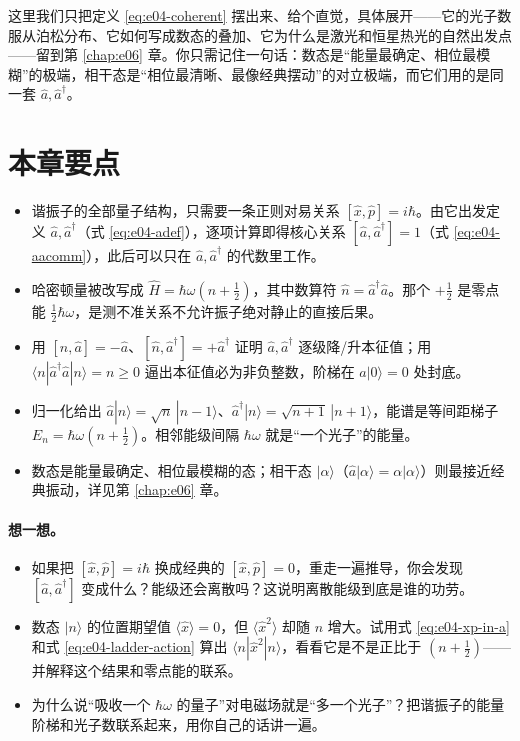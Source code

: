 这里我们只把定义 \eqref{eq:e04-coherent} 摆出来、给个直觉，具体展开——它的光子数服从泊松分布、它如何写成数态的叠加、它为什么是激光和恒星热光的自然出发点——留到第 \ref{chap:e06} 章。你只需记住一句话：数态是“能量最确定、相位最模糊”的极端，相干态是“相位最清晰、最像经典摆动”的对立极端，而它们用的是同一套 \(\hat a,\hat a^\dagger\)。

\section{本章要点}
\label{sec:e04-summary}

\begin{itemize}
  \item 谐振子的全部量子结构，只需要一条正则对易关系 \([\hat x,\hat p]=i\hbar\)。由它出发定义 \(\hat a,\hat a^\dagger\)（式 \eqref{eq:e04-adef}），逐项计算即得核心关系 \([\hat a,\hat a^\dagger]=1\)（式 \eqref{eq:e04-aacomm}），此后可以只在 \(\hat a,\hat a^\dagger\) 的代数里工作。
  \item 哈密顿量被改写成 \(\hat H=\hbar\omega(\hat n+\tfrac12)\)，其中数算符 \(\hat n=\hat a^\dagger\hat a\)。那个 \(+\tfrac12\) 是零点能 \(\tfrac12\hbar\omega\)，是测不准关系不允许振子绝对静止的直接后果。
  \item 用 \([\hat n,\hat a]=-\hat a\)、\([\hat n,\hat a^\dagger]=+\hat a^\dagger\) 证明 \(\hat a,\hat a^\dagger\) 逐级降/升本征值；用 \(\langle n|\hat a^\dagger\hat a|n\rangle=n\ge0\) 逼出本征值必为非负整数，阶梯在 \(\hat a|0\rangle=0\) 处封底。
  \item 归一化给出 \(\hat a|n\rangle=\sqrt{n}\,|n-1\rangle\)、\(\hat a^\dagger|n\rangle=\sqrt{n+1}\,|n+1\rangle\)，能谱是等间距梯子 \(E_n=\hbar\omega(n+\tfrac12)\)。相邻能级间隔 \(\hbar\omega\) 就是“一个光子”的能量。
  \item 数态是能量最确定、相位最模糊的态；相干态 \(|\alpha\rangle\)（\(\hat a|\alpha\rangle=\alpha|\alpha\rangle\)）则最接近经典振动，详见第 \ref{chap:e06} 章。
\end{itemize}

\paragraph{想一想。}
\begin{itemize}
  \item 如果把 \([\hat x,\hat p]=i\hbar\) 换成经典的 \([\hat x,\hat p]=0\)，重走一遍推导，你会发现 \([\hat a,\hat a^\dagger]\) 变成什么？能级还会离散吗？这说明离散能级到底是谁的功劳。
  \item 数态 \(|n\rangle\) 的位置期望值 \(\langle\hat x\rangle=0\)，但 \(\langle\hat x^2\rangle\) 却随 \(n\) 增大。试用式 \eqref{eq:e04-xp-in-a} 和式 \eqref{eq:e04-ladder-action} 算出 \(\langle n|\hat x^2|n\rangle\)，看看它是不是正比于 \((n+\tfrac12)\)——并解释这个结果和零点能的联系。
  \item 为什么说“吸收一个 \(\hbar\omega\) 的量子”对电磁场就是“多一个光子”？把谐振子的能量阶梯和光子数联系起来，用你自己的话讲一遍。
\end{itemize}
